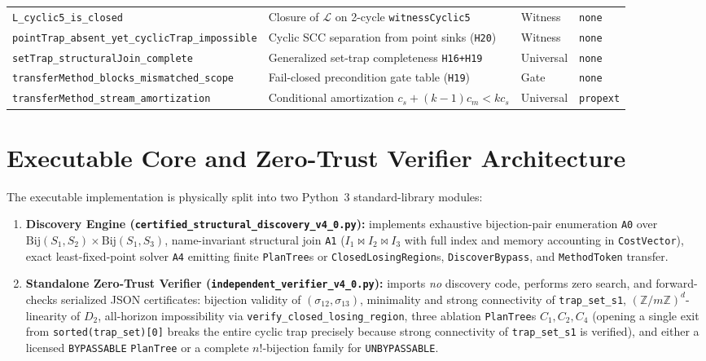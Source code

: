 \documentclass[10pt,a4paper]{article}
\newcommand{\code}[1]{\nolinkurl{#1}}
\begin{document}
\begin{table}[!htbp]
\begin{tabularx}{\linewidth}{@{}>{\raggedright\arraybackslash}p{6.5cm}>{\raggedright\arraybackslash}Xll@{}}
\code{L_cyclic5_is_closed} & Closure of $\mathcal{L}$ on 2-cycle \code{witnessCyclic5} & Witness & \code{none} \\
\code{pointTrap_absent_yet_cyclicTrap_impossible} & Cyclic SCC separation from point sinks (\code{H20}) & Witness & \code{none} \\
\code{setTrap_structuralJoin_complete} & Generalized set-trap completeness \code{H16+H19} & Universal & \code{none} \\
\code{transferMethod_blocks_mismatched_scope} & Fail-closed precondition gate table (\code{H19}) & Gate & \code{none} \\
\code{transferMethod_stream_amortization} & Conditional amortization $c_s+(k-1)c_m<kc_s$ & Universal & \code{propext} \\
\bottomrule
\end{tabularx}
\end{table}

\section{Executable Core and Zero-Trust Verifier Architecture}

The executable implementation is physically split into two Python~3 standard-library modules:
\begin{enumerate}
\item \textbf{Discovery Engine (\code{certified_structural_discovery_v4_0.py}):} implements exhaustive bijection-pair enumeration \code{A0} over $\mathrm{Bij}(S_1, S_2) \times \mathrm{Bij}(S_1, S_3)$, name-invariant structural join \code{A1} ($I_1 \bowtie I_2 \bowtie I_3$ with full index and memory accounting in \code{CostVector}), exact least-fixed-point solver \code{A4} emitting finite \code{PlanTree}s or \code{ClosedLosingRegion}s, \code{DiscoverBypass}, and \code{MethodToken} transfer.
\item \textbf{Standalone Zero-Trust Verifier (\code{independent_verifier_v4_0.py}):} imports \emph{no} discovery code, performs zero search, and forward-checks serialized JSON certificates: bijection validity of $(\sigma_{12}, \sigma_{13})$, minimality and strong connectivity of \code{trap_set_s1}, $(\mathbb{Z}/m\mathbb{Z})^d$-linearity of $D_2$, all-horizon impossibility via \code{verify_closed_losing_region}, three ablation \code{PlanTree}s $C_1, C_2, C_4$ (opening a single exit from \code{sorted(trap_set)[0]} breaks the entire cyclic trap precisely because strong connectivity of \code{trap_set_s1} is verified), and either a licensed \code{BYPASSABLE} \code{PlanTree} or a complete $n!$-bijection family for \code{UNBYPASSABLE}.
\end{enumerate}
\end{document}

